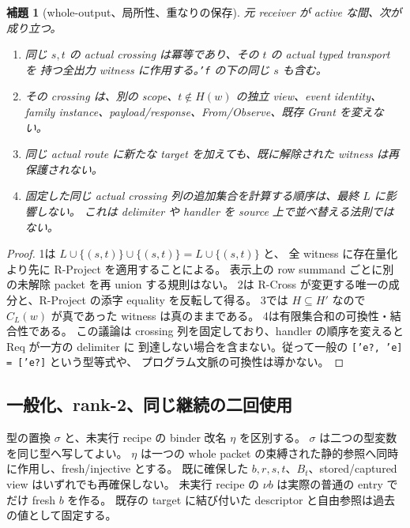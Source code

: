 \documentclass[11pt,a4paper]{article}
\newtheorem{lemma}[definition]{補題}
\begin{document}
\begin{lemma}[whole-output、局所性、重なりの保存]
\label{lem:release-overlap}
元 receiver が active な間、次が成り立つ。
\begin{enumerate}
\item 同じ \(s,t\) の actual crossing は冪等であり、その \(t\) の actual typed transport を
持つ全出力 witness に作用する。\texttt{'f} の下の同じ \(s\) も含む。
\item その crossing は、別の scope、\(t\notin H(w)\) の独立 view、event identity、
family instance、payload/response、From/Observe、既存 Grant を変えない。
\item 同じ actual route に新たな target を加えても、既に解除された witness は再保護されない。
\item 固定した同じ actual crossing 列の追加集合を計算する順序は、最終 \(L\) に影響しない。
これは delimiter や handler を source 上で並べ替える法則ではない。
\end{enumerate}
\end{lemma}
\begin{proof}
1は \(L\cup\{(s,t)\}\cup\{(s,t)\}=L\cup\{(s,t)\}\) と、
全 witness に存在量化より先に R-Project を適用することによる。
表示上の row summand ごとに別の未解除 packet を再 union する規則はない。
2は R-Cross が変更する唯一の成分と、R-Project の添字 equality を反転して得る。
3では \(H\subseteq H'\) なので \(C_L(w)\) が真であった witness は真のままである。
4は有限集合和の可換性・結合性である。
この議論は crossing 列を固定しており、handler の順序を変えると Req が一方の delimiter に
到達しない場合を含まない。従って一般の \texttt{['e?, 'e] = ['e?]} という型等式や、
プログラム文脈の可換性は導かない。
\end{proof}

\subsection{一般化、rank-2、同じ継続の二回使用}

型の置換 \(\sigma\) と、未実行 recipe の binder 改名 \(\eta\) を区別する。
\(\sigma\) は二つの型変数を同じ型へ写してよい。
\(\eta\) は一つの whole packet の束縛された静的参照へ同時に作用し、fresh/injective とする。
既に確保した \(b,r,s,t\)、\(B_t\)、stored/captured view はいずれでも再確保しない。
未実行 recipe の \(\nu b\) は実際の普通の entry でだけ fresh \(b\) を作る。
既存の target に結び付いた descriptor と自由参照は過去の値として固定する。
\end{document}
